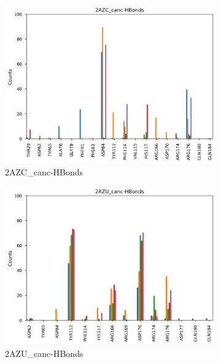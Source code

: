 \documentclass[fleqn,10pt]{wlscirep}
\begin{document}
\begin{figure}[!ht]
\centering
   \begin{subfigure}{.45\textwidth}
     \centering
     \includegraphics[width=.95\linewidth]{2AZC_canc/2AZC_canc-HBonds.png}
     \caption{2AZC_{canc}-HBonds}
     \label{fig:2AZC_canc-HBonds}
   \end{subfigure}
   \begin{subfigure}{.45\textwidth}
     \centering
     \includegraphics[width=.95\linewidth]{2AZU_canc/2AZU_canc-HBonds.png}
     \caption{2AZU_{canc}-HBonds}
     \label{fig:2AZU_canc-HBonds}
   \end{subfigure}
   \\
   \begin{subfigure}{.45\textwidth}
     \centering

\end{subfigure}
\end{figure}
\end{document}

